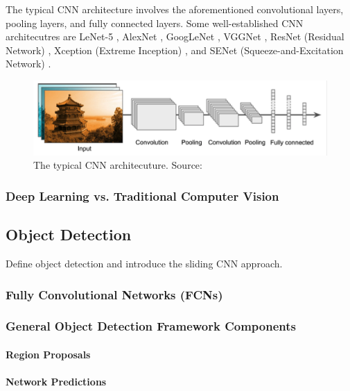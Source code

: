\documentclass[a4paper,11pt,oneside]{article}
\begin{document}
  The typical CNN architecture involves the aforementioned convolutional layers, pooling layers, and fully connected layers.
  Some well-established CNN architecutres are LeNet-5 \cite{lecun1998gradient}, AlexNet \cite{krizhevsky2012imagenet},
  GoogLeNet \cite{szegedy2015going}, VGGNet \cite{simonyan2014very}, ResNet (Residual Network) \cite{he2016deep}, Xception
  (Extreme Inception) \cite{chollet2017xception}, and SENet (Squeeze-and-Excitation Network) \cite{hu2018squeeze}.

  \begin{figure}[ht]
    \begin{center}
      \includegraphics[width=.8\textwidth]{typical_cnn.png}
    \end{center}
    \caption{The typical CNN architecuture. Source: \cite{geron2019hands}}
  \end{figure}

  \subsubsection{Deep Learning vs. Traditional Computer Vision}

  \subsection{Object Detection}

  Define object detection and introduce the sliding CNN approach.

  \subsubsection{Fully Convolutional Networks (FCNs)}

  \subsubsection{General Object Detection Framework Components}

  \paragraph{Region Proposals}
  \paragraph{Network Predictions}
\end{document}
